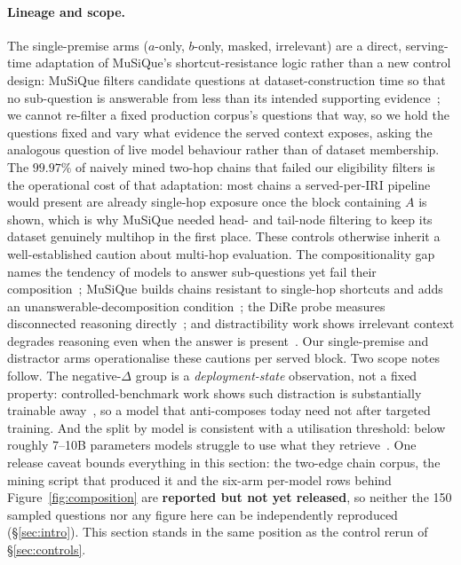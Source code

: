 \documentclass[10pt,twocolumn]{article}
\begin{document}
\paragraph{Lineage and scope.} The single-premise arms ($a$-only, $b$-only, masked, irrelevant) are a direct, serving-time adaptation of MuSiQue's shortcut-resistance logic rather than a new control design: MuSiQue filters candidate questions at dataset-construction time so that no sub-question is answerable from less than its intended supporting evidence~\cite{musique2022}; we cannot re-filter a fixed production corpus's questions that way, so we hold the questions fixed and vary what evidence the served context exposes, asking the analogous question of live model behaviour rather than of dataset membership. The $99.97\%$ of naively mined two-hop chains that failed our eligibility filters is the operational cost of that adaptation: most chains a served-per-IRI pipeline would present are already single-hop exposure once the block containing $A$ is shown, which is why MuSiQue needed head- and tail-node filtering to keep its dataset genuinely multihop in the first place. These controls otherwise inherit a well-established caution about multi-hop evaluation. The compositionality gap names the tendency of models to answer sub-questions yet fail their composition~\cite{press2023compgap}; MuSiQue builds chains resistant to single-hop shortcuts and adds an unanswerable-decomposition condition~\cite{musique2022}; the DiRe probe measures disconnected reasoning directly~\cite{dire2020}; and distractibility work shows irrelevant context degrades reasoning even when the answer is present~\cite{shi2023distracted,faithfate2023}. Our single-premise and distractor arms operationalise these cautions per served block. Two scope notes follow. The negative-$\Delta$ group is a \emph{deployment-state} observation, not a fixed property: controlled-benchmark work shows such distraction is substantially trainable away~\cite{gsmdc2025}, so a model that anti-composes today need not after targeted training. And the split by model is consistent with a utilisation threshold: below roughly 7--10B parameters models struggle to use what they retrieve~\cite{retrievalutil2026}. One release caveat bounds everything in this section: the two-edge chain corpus, the mining script that produced it and the six-arm per-model rows behind Figure~\ref{fig:composition} are \textbf{reported but not yet released}, so neither the 150 sampled questions nor any figure here can be independently reproduced (\S\ref{sec:intro}). This section stands in the same position as the control rerun of \S\ref{sec:controls}.
\end{document}
